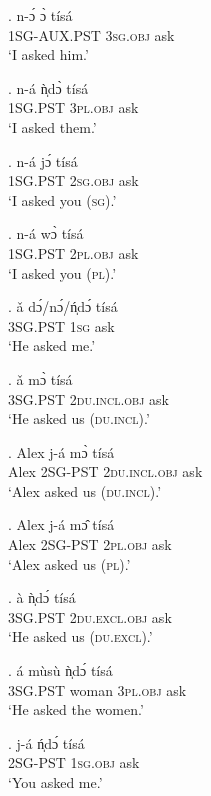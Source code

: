 \documentclass{assets/fieldnotes}
\begin{document}
\exg. n-ɔ́ ɔ̀ tísá\\
\textsc{1SG-AUX.PST} \textsc{3sg.obj} ask\\
`I asked him.’

\exg. n-á ǹ̩dɔ̀ tísá\\
\textsc{1SG.PST} \textsc{3pl.obj} ask\\
`I asked them.’

\exg. n-á jɔ́ tísá\\
\textsc{1SG.PST} \textsc{2sg.obj} ask\\
`I asked you (\textsc{sg}).’

\exg. n-á wɔ̀ tísá\\
\textsc{1SG.PST} \textsc{2pl.obj} ask\\
`I asked you (\textsc{pl}).’

\exg. ǎ dɔ́/nɔ́/ń̩dɔ́ tísá\\
\textsc{3SG.PST} \textsc{1sg} ask\\
`He asked me.’\\

\exg. ǎ mɔ̀ tísá\\
\textsc{3SG.PST} \textsc{2du.incl.obj} ask\\
`He asked us (\textsc{du.incl}).’


\exg. Alex j-á mɔ̀ tísá\\
Alex 2SG-PST \textsc{2du.incl.obj} ask\\
`Alex asked us (\textsc{du.incl}).’

\exg. Alex j-á mɔ̂ tísá\\
Alex 2SG-PST \textsc{2pl.obj} ask\\
`Alex asked us (\textsc{pl}).’

\exg. à ǹ̩dɔ́ tísá\\
3SG.PST \textsc{2du.excl.obj} ask\\
`He asked us (\textsc{du.excl}).'

\exg. á mùsù ǹ̩dɔ́ tísá\\
\textsc{3SG.PST} woman \textsc{3pl.obj} ask\\
`He asked the women.’

\exg. j-á ń̩dɔ́ tísá\\
\textsc{2SG-PST} \textsc{1sg.obj} ask\\
`You asked me.’
\end{document}
